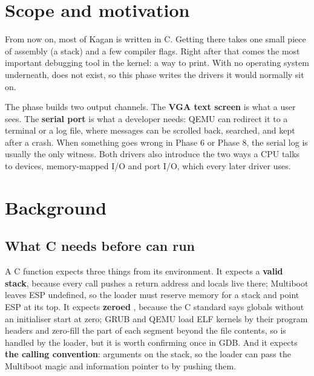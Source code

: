 \documentclass[11pt,a4paper]{article}
\begin{document}


\section{Scope and motivation}

From now on, most of Kagan is written in C. Getting there takes one small piece of assembly (a stack) and a few
compiler flags. Right after that comes the most important debugging tool in the kernel: a way to print. With no
operating system underneath,  does not exist, so this phase writes the drivers it would normally sit on.

The phase builds two output channels. The \textbf{VGA text screen} is what a user sees. The \textbf{serial port} is
what a developer needs: QEMU can redirect it to a terminal or a log file, where messages can be scrolled back,
searched, and kept after a crash. When something goes wrong in Phase 6 or Phase 8, the serial log is usually the
only witness. Both drivers also introduce the two ways a CPU talks to devices, memory-mapped I/O and port I/O, which
every later driver uses.

\section{Background}

\subsection{What C needs before \texorpdfstring{}{kmain} can run}

A C function expects three things from its environment. It expects a \textbf{valid stack}, because every call
pushes a return address and locals live there; Multiboot leaves ESP undefined, so the loader must reserve memory for
a stack and point ESP at its top. It expects \textbf{zeroed }, because the C standard says globals without
an initialiser start at zero; GRUB and QEMU load ELF kernels by their program headers and zero-fill the part of each
segment beyond the file contents, so  is handled by the loader, but it is worth confirming once in GDB. And it
expects \textbf{the calling convention}: arguments on the stack, so the loader can pass the Multiboot magic and
information pointer to  by pushing them.
\end{document}
